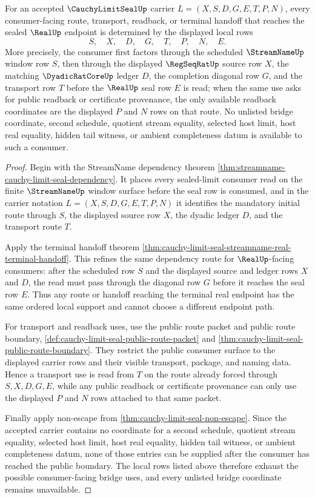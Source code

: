 \begin{theorem}
\label{thm:cauchy-limit-seal-streamname-bridge-determinacy}
For an accepted $\CauchyLimitSealUp$ carrier $L=(X,S,D,G,E,T,P,N)$, every consumer-facing route, transport, readback, or terminal handoff that reaches the sealed $\RealUp$ endpoint is determined by the displayed local rows
$$
S,\quad X,\quad D,\quad G,\quad T,\quad P,\quad N,\quad E.
$$
More precisely, the consumer first factors through the scheduled $\StreamNameUp$ window row $S$, then through the displayed $\RegSeqRatUp$ source row $X$, the matching $\DyadicRatCoreUp$ ledger $D$, the completion diagonal row $G$, and the transport row $T$ before the $\RealUp$ seal row $E$ is read; when the same use asks for public readback or certificate provenance, the only available readback coordinates are the displayed $P$ and $N$ rows on that route. No unlisted bridge coordinate, second schedule, quotient stream equality, selected host limit, host real equality, hidden tail witness, or ambient completeness datum is available to such a consumer.
\end{theorem}
\begin{proof}
Begin with the StreamName dependency theorem \autoref{thm:streamname-cauchy-limit-seal-dependency}. It places every sealed-limit consumer read on the finite $\StreamNameUp$ window surface before the seal row is consumed, and in the carrier notation $L=(X,S,D,G,E,T,P,N)$ it identifies the mandatory initial route through $S$, the displayed source row $X$, the dyadic ledger $D$, and the transport route $T$.

Apply the terminal handoff theorem \autoref{thm:cauchy-limit-seal-streamname-real-terminal-handoff}. This refines the same dependency route for $\RealUp$-facing consumers: after the scheduled row $S$ and the displayed source and ledger rows $X$ and $D$, the read must pass through the diagonal row $G$ before it reaches the seal row $E$. Thus any route or handoff reaching the terminal real endpoint has the same ordered local support and cannot choose a different endpoint path.

For transport and readback uses, use the public route packet and public route boundary, \autoref{def:cauchy-limit-seal-public-route-packet} and \autoref{thm:cauchy-limit-seal-public-route-boundary}. They restrict the public consumer surface to the displayed carrier rows and their visible transport, package, and naming data. Hence a transport use is read from $T$ on the route already forced through $S,X,D,G,E$, while any public readback or certificate provenance can only use the displayed $P$ and $N$ rows attached to that same packet.

Finally apply non-escape from \autoref{thm:cauchy-limit-seal-non-escape}. Since the accepted carrier contains no coordinate for a second schedule, quotient stream equality, selected host limit, host real equality, hidden tail witness, or ambient completeness datum, none of those entries can be supplied after the consumer has reached the public boundary. The local rows listed above therefore exhaust the possible consumer-facing bridge uses, and every unlisted bridge coordinate remains unavailable.
\end{proof}

